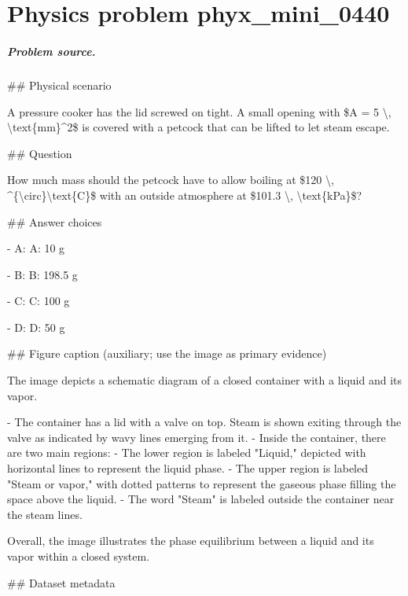 
\chapter{Physics problem phyx\_mini\_0440}
\label{ch:PhyXMiniProblems_problem_phyx_mini_0440}

\paragraph{Problem source.}
\#\# Physical scenario

A pressure cooker has the lid screwed on tight. A small opening with \$A = 5 \textbackslash{}, \textbackslash{}text\{mm\}\textasciicircum{}2\$ is covered with a petcock that can be lifted to let steam escape.

\#\# Question

How much mass should the petcock have to allow boiling at \$120 \textbackslash{}, \textasciicircum{}\{\textbackslash{}circ\}\textbackslash{}text\{C\}\$ with an outside atmosphere at \$101.3 \textbackslash{}, \textbackslash{}text\{kPa\}\$?

\#\# Answer choices

- A: A: 10 g

- B: B: 198.5 g

- C: C: 100 g

- D: D: 50 g

\#\# Figure caption (auxiliary; use the image as primary evidence)

The image depicts a schematic diagram of a closed container with a liquid and its vapor. 

- The container has a lid with a valve on top. Steam is shown exiting through the valve as indicated by wavy lines emerging from it.
- Inside the container, there are two main regions:
  - The lower region is labeled "Liquid," depicted with horizontal lines to represent the liquid phase.
  - The upper region is labeled "Steam or vapor," with dotted patterns to represent the gaseous phase filling the space above the liquid.
- The word "Steam" is labeled outside the container near the steam lines.

Overall, the image illustrates the phase equilibrium between a liquid and its vapor within a closed system.

\#\# Dataset metadata

